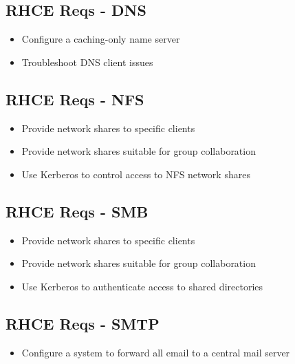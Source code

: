 \documentclass[letterpaper,10pt,english]{sphinxmanual}
\begin{document}
\subsection{RHCE Reqs - DNS}
\label{intro:rhce-reqs-dns}\begin{itemize}
\item {} 
Configure a caching-only name server

\item {} 
Troubleshoot DNS client issues

\end{itemize}


\subsection{RHCE Reqs - NFS}
\label{intro:rhce-reqs-nfs}\begin{itemize}
\item {} 
Provide network shares to specific clients

\item {} 
Provide network shares suitable for group collaboration

\item {} 
Use Kerberos to control access to NFS network shares

\end{itemize}


\subsection{RHCE Reqs - SMB}
\label{intro:rhce-reqs-smb}\begin{itemize}
\item {} 
Provide network shares to specific clients

\item {} 
Provide network shares suitable for group collaboration

\item {} 
Use Kerberos to authenticate access to shared directories

\end{itemize}


\subsection{RHCE Reqs - SMTP}
\label{intro:rhce-reqs-smtp}\begin{itemize}
\item {} 
Configure a system to forward all email to a central mail server

\end{itemize}
\end{document}
